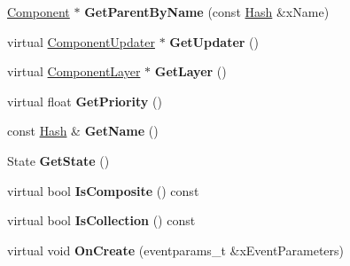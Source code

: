 \begin{DoxyCompactItemize}
\item 
\hypertarget{class_k_g_e_1_1_component_a110fe64c4ae028a0d17f6c887be4753d}{\hyperlink{class_k_g_e_1_1_component}{Component} $\ast$ {\bfseries Get\-Parent\-By\-Name} (const \hyperlink{class_k_g_e_1_1_hash}{Hash} \&x\-Name)}\label{class_k_g_e_1_1_component_a110fe64c4ae028a0d17f6c887be4753d}

\item 
\hypertarget{class_k_g_e_1_1_component_ae97d8043655d44bf23efaf34ad07ac09}{virtual \hyperlink{class_k_g_e_1_1_component_updater}{Component\-Updater} $\ast$ {\bfseries Get\-Updater} ()}\label{class_k_g_e_1_1_component_ae97d8043655d44bf23efaf34ad07ac09}

\item 
\hypertarget{class_k_g_e_1_1_component_a85db1628f659dd44ef0933e4cbcdea78}{virtual \hyperlink{class_k_g_e_1_1_component_layer}{Component\-Layer} $\ast$ {\bfseries Get\-Layer} ()}\label{class_k_g_e_1_1_component_a85db1628f659dd44ef0933e4cbcdea78}

\item 
\hypertarget{class_k_g_e_1_1_component_a9c2c70f08da7fe7d0e94c4eee1ef2c37}{virtual float {\bfseries Get\-Priority} ()}\label{class_k_g_e_1_1_component_a9c2c70f08da7fe7d0e94c4eee1ef2c37}

\item 
\hypertarget{class_k_g_e_1_1_component_aaa31b2c83d8981fa4f7ba0bd2a496062}{const \hyperlink{class_k_g_e_1_1_hash}{Hash} \& {\bfseries Get\-Name} ()}\label{class_k_g_e_1_1_component_aaa31b2c83d8981fa4f7ba0bd2a496062}

\item 
\hypertarget{class_k_g_e_1_1_component_a08ef1943824c6ed24a1f022e5b70e03a}{State {\bfseries Get\-State} ()}\label{class_k_g_e_1_1_component_a08ef1943824c6ed24a1f022e5b70e03a}

\item 
\hypertarget{class_k_g_e_1_1_component_ae79e0c0cb5109749dd62e3f4bcac3dd2}{virtual bool {\bfseries Is\-Composite} () const }\label{class_k_g_e_1_1_component_ae79e0c0cb5109749dd62e3f4bcac3dd2}

\item 
\hypertarget{class_k_g_e_1_1_component_a7587279caf161378404ecaa0ed7582e4}{virtual bool {\bfseries Is\-Collection} () const }\label{class_k_g_e_1_1_component_a7587279caf161378404ecaa0ed7582e4}

\item 
\hypertarget{class_k_g_e_1_1_component_ad18fab646887afea15a21144ea59d5d4}{virtual void {\bfseries On\-Create} (eventparams\-\_\-t \&x\-Event\-Parameters)}\label{class_k_g_e_1_1_component_ad18fab646887afea15a21144ea59d5d4}


\end{DoxyCompactItemize}
